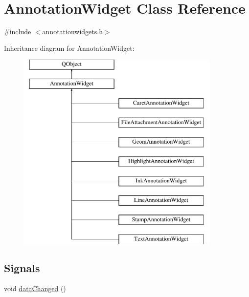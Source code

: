\hypertarget{classAnnotationWidget}{\section{Annotation\+Widget Class Reference}
\label{classAnnotationWidget}
}


{\ttfamily \#include $<$annotationwidgets.\+h$>$}

Inheritance diagram for Annotation\+Widget\+:\begin{figure}[H]
\begin{center}
\leavevmode
\includegraphics[height=10.000000cm]{classAnnotationWidget}
\end{center}
\end{figure}
\subsection*{Signals}
\begin{DoxyCompactItemize}
\item 
void \hyperlink{classAnnotationWidget_af9dcb02a8b69a602225c9844b5deb6d4}{data\+Changed} ()
\end{DoxyCompactItemize}
